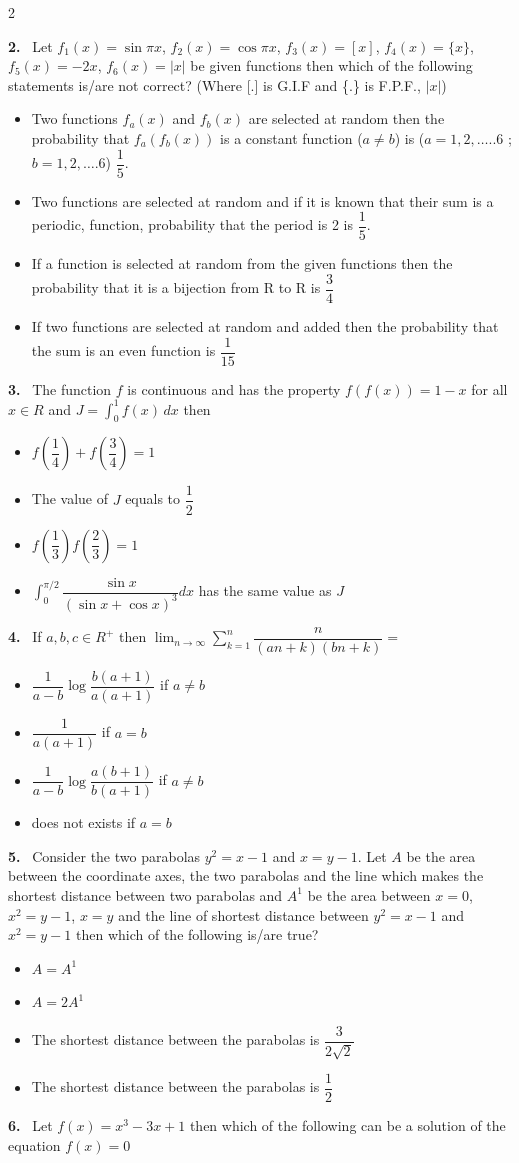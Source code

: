 \documentclass[10pt]{extarticle}
\newcommand{\qn}[1]{\par\smallskip\noindent\textbf{#1.}~}
\newenvironment{qoptions}{\begin{itemize}[leftmargin=1.8em,itemsep=1pt,topsep=2pt,label={}]}{\end{itemize}}
\newcommand{\opt}[2]{\item[(#1)] #2}
\begin{document}
\begin{multicols}{2}
\qn{2} Let $f_1(x)=\sin\pi x$, $f_2(x)=\cos\pi x$, $f_3(x)=[x]$, $f_4(x)=\{x\}$, $f_5(x)=-2x$, $f_6(x)=|x|$ be given functions then which of the following statements is/are not correct? (Where [.] is G.I.F and \{.\} is F.P.F., $|x|$)
\begin{qoptions}
\opt{A}{Two functions $f_a(x)$ and $f_b(x)$ are selected at random then the probability that $f_a(f_b(x))$ is a constant function ($a\neq b$) is ($a=1,2,\ldots..6$ ; $b=1,2,\ldots.6$) $\dfrac15$.}
\opt{B}{Two functions are selected at random and if it is known that their sum is a periodic, function, probability that the period is 2 is $\dfrac15$.}
\opt{C}{If a function is selected at random from the given functions then the probability that it is a bijection from R to R is $\dfrac34$}
\opt{D}{If two functions are selected at random and added then the probability that the sum is an even function is $\dfrac{1}{15}$}
\end{qoptions}
\qn{3} The function $f$ is continuous and has the property $f(f(x))=1-x$ for all $x\in R$ and $J=\displaystyle\int_0^1f(x)\,dx$ then
\begin{qoptions}
\opt{A}{$f\left(\dfrac14\right)+f\left(\dfrac34\right)=1$}
\opt{B}{The value of $J$ equals to $\dfrac12$}
\opt{C}{$f\left(\dfrac13\right)f\left(\dfrac23\right)=1$}
\opt{D}{$\displaystyle\int_0^{\pi/2}\dfrac{\sin x}{(\sin x+\cos x)^3}dx$ has the same value as $J$}
\end{qoptions}
\qn{4} If $a,b,c\in R^+$ then $\displaystyle\lim_{n\to\infty}\sum_{k=1}^n\dfrac{n}{(an+k)(bn+k)}=$
\begin{qoptions}
\opt{A}{$\dfrac{1}{a-b}\log\dfrac{b(a+1)}{a(a+1)}$ if $a\neq b$}
\opt{B}{$\dfrac{1}{a(a+1)}$ if $a=b$}
\opt{C}{$\dfrac{1}{a-b}\log\dfrac{a(b+1)}{b(a+1)}$ if $a\neq b$}
\opt{D}{does not exists if $a=b$}
\end{qoptions}
\qn{5} Consider the two parabolas $y^2=x-1$ and $x=y-1$. Let $A$ be the area between the coordinate axes, the two parabolas and the line which makes the shortest distance between two parabolas and $A^1$ be the area between $x=0$, $x^2=y-1$, $x=y$ and the line of shortest distance between $y^2=x-1$ and $x^2=y-1$ then which of the following is/are true?
\begin{qoptions}
\opt{A}{$A=A^1$}
\opt{B}{$A=2A^1$}
\opt{C}{The shortest distance between the parabolas is $\dfrac{3}{2\sqrt2}$}
\opt{D}{The shortest distance between the parabolas is $\dfrac12$}
\end{qoptions}
\qn{6} Let $f(x)=x^3-3x+1$ then which of the following can be a solution of the equation $f(x)=0$

\end{multicols}
\end{document}
